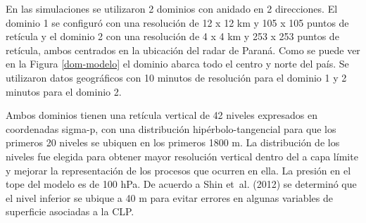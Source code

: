 \documentclass[12pt,spanish,oneside, a4paper]{book}
\begin{document}
En las simulaciones se utilizaron 2 dominios con anidado en 2
direcciones. El dominio 1 se configuró con una resolución de 12 x 12 km
y 105 x 105 puntos de retícula y el dominio 2 con una resolución de 4 x
4 km y 253 x 253 puntos de retícula, ambos centrados en la ubicación del
radar de Paraná. Como se puede ver en la Figura \ref{dom-modelo} el
dominio abarca todo el centro y norte del país. Se utilizaron datos
geográficos con 10 minutos de resolución para el dominio 1 y 2 minutos
para el dominio 2.

Ambos dominios tienen una retícula vertical de 42 niveles expresados en
coordenadas sigma-p, con una distribución hipérbolo-tangencial para que
los primeros 20 niveles se ubiquen en los primeros 1800 m. La
distribución de los niveles fue elegida para obtener mayor resolución
vertical dentro del a capa límite y mejorar la representación de los
procesos que ocurren en ella. La presión en el tope del modelo es de 100
hPa. De acuerdo a Shin et~al. (2012) se determinó que el nivel inferior
se ubique a 40 m para evitar errores en algunas variables de superficie
asociadas a la CLP.
\end{document}
